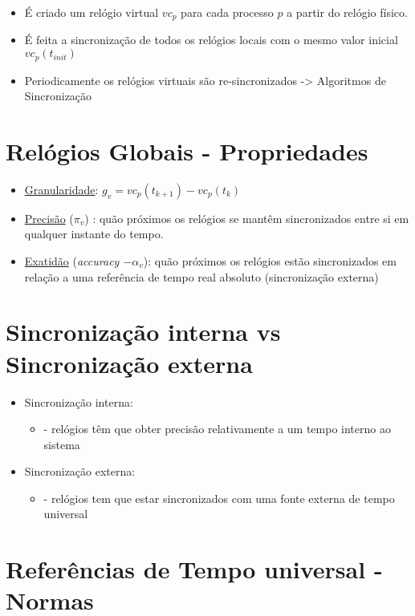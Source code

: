 \documentclass{article}
\begin{document}
\begin{itemize}
    \item É criado um relógio virtual $vc_p$ para cada processo $p$ a partir do relógio físico.
    \item É feita a sincronização de todos os relógios locais com o mesmo valor inicial $vc_p(t_{init})$
    \item Periodicamente os relógios virtuais são re-sincronizados -> Algoritmos de Sincronização 
\end{itemize}

\section{\textbf{Relógios Globais} - Propriedades}
\begin{itemize}
    \item \underline{Granularidade}: $g_v = vc_p(t_{k+1}) - vc_p(t_k)$
    \item \underline{Precisão} ($\pi_v$) : quão próximos os relógios se mantêm sincronizados entre si em qualquer instante do tempo. 
    \item \underline{Exatidão} (\textit{accuracy $-\alpha_v$}): quão próximos os relógios estão sincronizados em relação a uma referência de tempo real absoluto (sincronização externa)
\end{itemize}

\section{Sincronização interna vs Sincronização externa}

\begin{itemize}
    \item Sincronização interna:
    \begin{itemize}
        \item - relógios têm que obter precisão relativamente a um tempo interno ao sistema
    \end{itemize}
    \item Sincronização externa:
    \begin{itemize}
        \item - relógios tem que estar sincronizados com uma fonte externa de tempo universal
    \end{itemize}
\end{itemize}

\section{Referências de Tempo universal - Normas}
\end{document}
